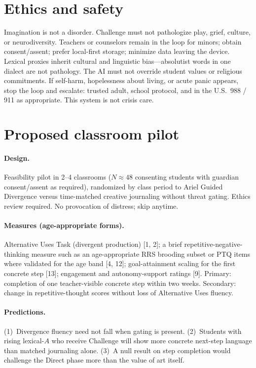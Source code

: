 \documentclass[11pt, a4paper]{article}
\begin{document}
\section{Ethics and safety}
Imagination is not a disorder. Challenge must not pathologize play, grief, culture, or neurodiversity. Teachers or counselors remain in the loop for minors; obtain consent/assent; prefer local-first storage; minimize data leaving the device. Lexical proxies inherit cultural and linguistic bias---absolutist words in one dialect are not pathology. The AI must not override student values or religious commitments. If self-harm, hopelessness about living, or acute panic appears, stop the loop and escalate: trusted adult, school protocol, and in the U.S.\ 988 / 911 as appropriate. This system is not crisis care.

\section{Proposed classroom pilot}
\paragraph{Design.} Feasibility pilot in 2--4 classrooms ($N\approx48$ consenting students with guardian consent/assent as required), randomized by class period to Ariel Guided Divergence versus time-matched creative journaling without threat gating. Ethics review required. No provocation of distress; skip anytime.
\paragraph{Measures (age-appropriate forms).} Alternative Uses Task (divergent production) [1, 2]; a brief repetitive-negative-thinking measure such as an age-appropriate RRS brooding subset or PTQ items where validated for the age band [4, 12]; goal-attainment scaling for the first concrete step [13]; engagement and autonomy-support ratings [9]. Primary: completion of one teacher-visible concrete step within two weeks. Secondary: change in repetitive-thought scores without loss of Alternative Uses fluency.
\paragraph{Predictions.} (1)~Divergence fluency need not fall when gating is present. (2)~Students with rising lexical-$A$ who receive Challenge will show more concrete next-step language than matched journaling alone. (3)~A null result on step completion would challenge the Direct phase more than the value of art itself.
\end{document}

